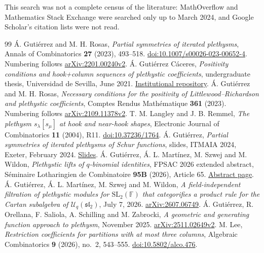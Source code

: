 \documentclass[11pt]{article}
\begin{document}
This search was not a complete census of the literature: MathOverflow and Mathematics Stack Exchange were searched only up to March 2024, and Google Scholar's citation lists were not read.

{\small
\begin{thebibliography}{99}
 Á. Gutiérrez and M. H. Rosas, \emph{Partial symmetries of iterated plethysms}, Annals of Combinatorics \textbf{27} (2023), 493--518. \href{https://doi.org/10.1007/s00026-023-00652-4}{doi:10.1007/s00026-023-00652-4}. Numbering follows \href{https://arxiv.org/abs/2201.00240v2}{arXiv:2201.00240v2}.
 Á. Gutiérrez Cáceres, \emph{Positivity conditions and hook+column sequences of plethystic coefficients}, undergraduate thesis, Universidad de Sevilla, June 2021. \href{https://idus.us.es/handle/11441/133706}{Institutional repository}.
 Á. Gutiérrez and M. H. Rosas, \emph{Necessary conditions for the positivity of Littlewood--Richardson and plethystic coefficients}, Comptes Rendus Mathématique \textbf{361} (2023). Numbering follows \href{https://arxiv.org/abs/2109.11378v2}{arXiv:2109.11378v2}.
 T. M. Langley and J. B. Remmel, \emph{The plethysm $s_\lambda[s_\mu]$ at hook and near-hook shapes}, Electronic Journal of Combinatorics \textbf{11} (2004), R11. \href{https://doi.org/10.37236/1764}{doi:10.37236/1764}.
 Á. Gutiérrez, \emph{Partial symmetries of iterated plethysms of Schur functions}, slides, ITMAIA 2024, Exeter, February 2024. \href{https://drive.google.com/uc?export=download&id=1AqlTl0K5C-mCIo-A49xohpmC36v0BkzR}{Slides}.
 Á. Gutiérrez, Á. L. Martínez, M. Szwej and M. Wildon, \emph{Plethystic lifts of $q$-binomial identities}, FPSAC 2026 extended abstract, Séminaire Lotharingien de Combinatoire \textbf{95B} (2026), Article 65. \href{https://www.mat.univie.ac.at/~slc/wpapers/FPSAC2026/65.html}{Abstract page}.
 Á. Gutiérrez, Á. L. Martínez, M. Szwej and M. Wildon, \emph{A field-independent filtration of plethystic modules for $\mathrm{SL}_2(\mathbb{F})$ that categorifies a product rule for the Cartan subalgebra of $\mathcal{U}_q(\mathfrak{sl}_2)$}, July 7, 2026. \href{https://arxiv.org/abs/2607.06749}{arXiv:2607.06749}.
 Á. Gutiérrez, R. Orellana, F. Saliola, A. Schilling and M. Zabrocki, \emph{A geometric and generating function approach to plethysm}, November 2025. \href{https://arxiv.org/abs/2511.02649v2}{arXiv:2511.02649v2}.
 M. Lee, \emph{Restriction coefficients for partitions with at most three columns}, Algebraic Combinatorics \textbf{9} (2026), no.~2, 543--555. \href{https://doi.org/10.5802/alco.476}{doi:10.5802/alco.476}.

\end{thebibliography}}
\end{document}
